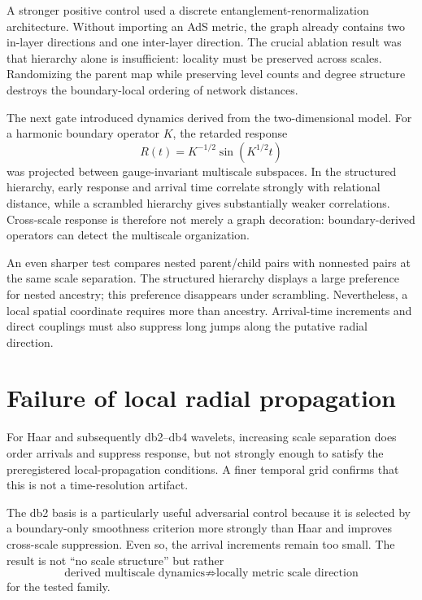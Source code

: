 \documentclass[11pt,a4paper]{article}
\begin{document}
A stronger positive control used a discrete entanglement-renormalization architecture. Without importing an AdS metric, the graph already contains two in-layer directions and one inter-layer direction. The crucial ablation result was that hierarchy alone is insufficient: locality must be preserved across scales. Randomizing the parent map while preserving level counts and degree structure destroys the boundary-local ordering of network distances.

The next gate introduced dynamics derived from the two-dimensional model. For a harmonic boundary operator $K$, the retarded response
\begin{equation}
R(t)=K^{-1/2}\sin(K^{1/2}t)
\end{equation}
was projected between gauge-invariant multiscale subspaces. In the structured hierarchy, early response and arrival time correlate strongly with relational distance, while a scrambled hierarchy gives substantially weaker correlations. Cross-scale response is therefore not merely a graph decoration: boundary-derived operators can detect the multiscale organization.

An even sharper test compares nested parent/child pairs with nonnested pairs at the same scale separation. The structured hierarchy displays a large preference for nested ancestry; this preference disappears under scrambling. Nevertheless, a local spatial coordinate requires more than ancestry. Arrival-time increments and direct couplings must also suppress long jumps along the putative radial direction.

\section{Failure of local radial propagation}
For Haar and subsequently db2--db4 wavelets, increasing scale separation does order arrivals and suppress response, but not strongly enough to satisfy the preregistered local-propagation conditions. A finer temporal grid confirms that this is not a time-resolution artifact.

The db2 basis is a particularly useful adversarial control because it is selected by a boundary-only smoothness criterion more strongly than Haar and improves cross-scale suppression. Even so, the arrival increments remain too small. The result is not ``no scale structure'' but rather
\begin{equation}
\text{derived multiscale dynamics} \not\Rightarrow \text{locally metric scale direction}
\end{equation}
for the tested family.
\end{document}
